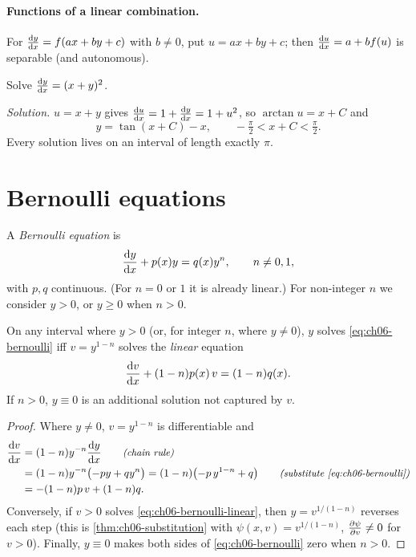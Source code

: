\paragraph{Functions of a linear combination.} For $\frac{\mathrm{d}y}{\mathrm{d}x} = f(ax + by + c)$
with $b\neq 0$, put $u = ax + by + c$; then $\frac{\mathrm{d}u}{\mathrm{d}x} = a + bf(u)$ is
separable (and autonomous).

\begin{example}[$u = x + y$]\label{ex:ch06-xplusy}
Solve $\frac{\mathrm{d}y}{\mathrm{d}x} = (x + y)^2$.

\emph{Solution.} $u = x + y$ gives $\frac{\mathrm{d}u}{\mathrm{d}x} = 1 + \frac{\mathrm{d}y}{\mathrm{d}x} = 1 + u^2$,
so $\arctan u = x + C$ and
\[
  y = \tan(x + C) - x,\qquad -\tfrac\pi2 < x + C < \tfrac\pi2 .
\]
Every solution lives on an interval of length exactly $\pi$.
\end{example}

\section{Bernoulli equations}\label{sec:ch06-bernoulli}

\begin{definition}\label{def:ch06-bernoulli}
A \emph{Bernoulli equation} is
\begin{equation}\label{eq:ch06-bernoulli}
  \frac{\mathrm{d}y}{\mathrm{d}x} + p(x)y = q(x)y^n,\qquad n\neq 0,1,
\end{equation}
with $p,q$ continuous. (For $n = 0$ or $1$ it is already linear.) For
non-integer $n$ we consider $y>0$, or $y\ge0$ when $n>0$.
\end{definition}

\begin{proposition}\label{prop:ch06-bernoulli}
On any interval where $y>0$ (or, for integer $n$, where $y\neq0$), $y$ solves
\eqref{eq:ch06-bernoulli} iff $v = y^{1-n}$ solves the \emph{linear} equation
\begin{equation}\label{eq:ch06-bernoulli-linear}
  \frac{\mathrm{d}v}{\mathrm{d}x} + (1-n)p(x)\,v = (1-n)q(x).
\end{equation}
If $n>0$, $y\equiv0$ is an additional solution not captured by $v$.
\end{proposition}
\begin{proof}
Where $y\neq0$, $v = y^{1-n}$ is differentiable and
\begin{align*}
  \frac{\mathrm{d}v}{\mathrm{d}x} &= (1-n)y^{-n}\frac{\mathrm{d}y}{\mathrm{d}x} \qquad\text{\small\itshape(chain rule)}\\
  &= (1-n)y^{-n}\bigl(-py + qy^n\bigr) = (1-n)\bigl(-p\,y^{1-n} + q\bigr)
     \qquad\text{\small\itshape(substitute \eqref{eq:ch06-bernoulli})}\\
  &= -(1-n)p\,v + (1-n)q .
\end{align*}
Conversely, if $v>0$ solves \eqref{eq:ch06-bernoulli-linear}, then
$y = v^{1/(1-n)}$ reverses each step (this is \cref{thm:ch06-substitution} with
$\psi(x,v) = v^{1/(1-n)}$, $\frac{\partial \psi}{\partial v}\neq 0$ for $v>0$). Finally,
$y\equiv0$ makes both sides of \eqref{eq:ch06-bernoulli} zero when $n>0$.
\end{proof}

